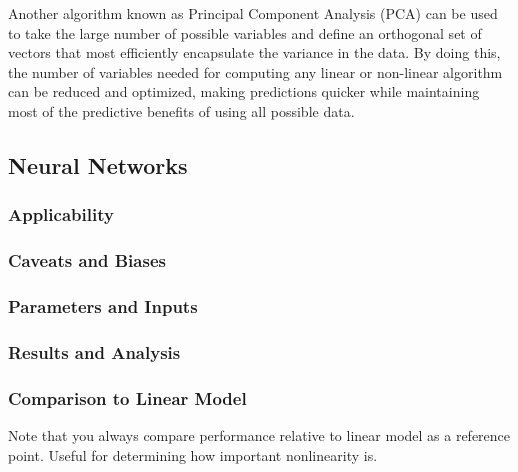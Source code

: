 Another algorithm known as Principal Component Analysis (PCA) can be used to take the large number of possible variables and define an orthogonal set of vectors that most efficiently encapsulate the variance in the data. By doing this, the number of variables needed for computing any linear or non-linear algorithm can be reduced and optimized, making predictions quicker while maintaining most of the predictive benefits of using all possible data.

\subsection{Neural Networks}

\subsubsection{Applicability}

\subsubsection{Caveats and Biases}

\subsubsection{Parameters and Inputs}

\subsubsection{Results and Analysis}

\subsubsection{Comparison to Linear Model}

Note that you always compare performance relative to linear model as a reference point.  Useful for determining how important nonlinearity is.
